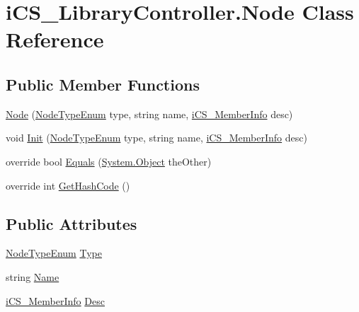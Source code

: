 \hypertarget{classi_c_s___library_controller_1_1_node}{\section{i\+C\+S\+\_\+\+Library\+Controller.\+Node Class Reference}
\label{classi_c_s___library_controller_1_1_node}
}
\subsection*{Public Member Functions}
\begin{DoxyCompactItemize}
\item 
\hyperlink{classi_c_s___library_controller_1_1_node_a45ca29591afc037176057226f2ad7664}{Node} (\hyperlink{classi_c_s___library_controller_a9da5d971241a996d5f9a9fd1a784a562}{Node\+Type\+Enum} type, string name, \hyperlink{classi_c_s___member_info}{i\+C\+S\+\_\+\+Member\+Info} desc)
\item 
void \hyperlink{classi_c_s___library_controller_1_1_node_ab69b2119a03f12aacdb44b6ecb43e84e}{Init} (\hyperlink{classi_c_s___library_controller_a9da5d971241a996d5f9a9fd1a784a562}{Node\+Type\+Enum} type, string name, \hyperlink{classi_c_s___member_info}{i\+C\+S\+\_\+\+Member\+Info} desc)
\item 
override bool \hyperlink{classi_c_s___library_controller_1_1_node_ae3bc2ee8ee5e5b05deed0c494ecfd825}{Equals} (\hyperlink{i_c_s___logic_8cs_a5b2c8b05b9a357906d7f9e5b2c1e154d}{System.\+Object} the\+Other)
\item 
override int \hyperlink{classi_c_s___library_controller_1_1_node_ad0e86eeed645da8d2304ba9211647f0e}{Get\+Hash\+Code} ()
\end{DoxyCompactItemize}
\subsection*{Public Attributes}
\begin{DoxyCompactItemize}
\item 
\hyperlink{classi_c_s___library_controller_a9da5d971241a996d5f9a9fd1a784a562}{Node\+Type\+Enum} \hyperlink{classi_c_s___library_controller_1_1_node_a73aa9c7d6f45184c3e7c530e26bbee78}{Type}
\item 
string \hyperlink{classi_c_s___library_controller_1_1_node_a4110b68b5d99a272b06807aee8c0850c}{Name}
\item 
\hyperlink{classi_c_s___member_info}{i\+C\+S\+\_\+\+Member\+Info} \hyperlink{classi_c_s___library_controller_1_1_node_a0eab39f7d2ec80e1bcf56ecf12874703}{Desc}
\end{DoxyCompactItemize}


